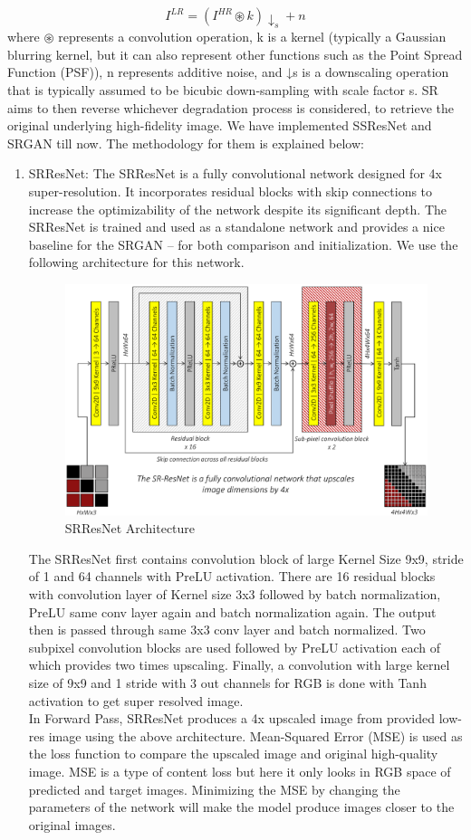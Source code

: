 $$I^{LR}= (I^{HR} \circledast k)\downarrow_s + n$$
where $\circledast$ represents a convolution operation, k is a kernel (typically a Gaussian blurring
kernel, but it can also represent other functions such as the Point Spread Function
(PSF)), n represents additive noise, and ↓s is a downscaling operation that is typically
assumed to be bicubic down-sampling with scale factor s.
SR aims to then reverse whichever degradation process is considered, to retrieve the original underlying high-fidelity image. We have implemented SSResNet and SRGAN till now. The methodology for them is explained below: 
\begin{enumerate}
    \item SRResNet: The SRResNet is a fully convolutional network designed for 4x super-resolution. It incorporates residual blocks with skip connections to increase the optimizability of the network despite its significant depth. The SRResNet is trained and used as a standalone network and provides a nice baseline for the SRGAN – for both comparison and initialization. We use the following architecture for this network.
    \begin{figure}[ht]
        \centering
        \includegraphics[width=6in]{./figures/srresnet.png}
        \caption{SRResNet Architecture}
    \end{figure}
    The SRResNet first contains convolution block of large Kernel Size 9x9, stride of 1 and 64 channels with PreLU activation. There are 16 residual blocks with convolution layer of Kernel size 3x3 followed by batch normalization, PreLU same conv layer again and batch normalization again. The output then is passed through same 3x3 conv layer and batch normalized. Two subpixel convolution blocks are used followed by PreLU activation each of which provides two times upscaling. Finally, a convolution with large kernel size of 9x9 and 1 stride with 3 out channels for RGB is done with Tanh activation to get super resolved image.\\ In Forward Pass, SRResNet produces a 4x upscaled image from provided low-res image using the above architecture. Mean-Squared Error (MSE) is used as the loss function to compare the upscaled image and original high-quality image. MSE is a type of content loss but here it only looks in RGB space of predicted and target images. Minimizing the MSE by changing the parameters of the network will make the model produce images closer to the original images.

    \end{enumerate}
